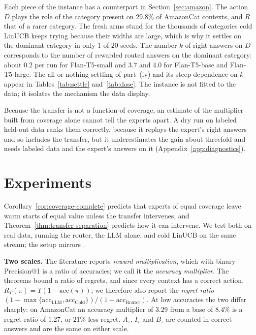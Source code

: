 \documentclass[anon]{alt2027} %
\begin{document}
\begin{remark}
\label{rem:transfer-amazon}
Each piece of the instance has a counterpart in Section~\ref{sec:amazon}.
The action $D$ plays the role of the category present on $29.8\%$ of
AmazonCat contexts, and $R$ that of a rarer category. The fresh arms stand for
the thousands of categories cold LinUCB keeps trying because their widths
are large, which is why it settles on the dominant category in only $1$ of
$20$ seeds. The number $k$ of right answers on $D$ corresponds to the number
of rewarded routed answers on the dominant category: about $0.2$ per run for
Flan-T5-small and $3.7$ and $4.0$ for Flan-T5-base and Flan-T5-large. The
all-or-nothing settling of part~(iv) and its steep dependence on $k$ appear
in Tables~\ref{tab:settle} and~\ref{tab:dose}. The instance is not fitted to
the data; it isolates the mechanism the data display.
\end{remark}

Because the transfer is not a function of coverage, an estimate of the
multiplier built from coverage alone cannot tell the experts apart. A dry run
on labeled held-out data ranks them correctly, because it replays the expert's
right answers and so includes the transfer, but it underestimates the gain
about threefold and needs labeled data and the expert's answers on it
(Appendix~\ref{app:diagnostics}).

\section{Experiments}
\label{sec:experiments}

Corollary~\ref{cor:coverage-complete} predicts that experts of equal coverage
leave warm starts of equal value unless the transfer intervenes, and
Theorem~\ref{thm:transfer-separation} predicts how it can intervene. We test
both on real data, running the router, the LLM alone, and cold LinUCB on the
same stream; the setup mirrors \citet{chen2024llmdecision}.

\textbf{Two scales.} The literature reports \emph{reward multiplication},
which with binary Precision@1 is a ratio of accuracies; we call it the
\emph{accuracy multiplier}. The theorems bound a ratio of regrets, and since
every context has a correct action, $R_T(\pi)=T(1-\mathrm{acc}(\pi))$; we
therefore also report the \emph{regret ratio}
$(1-\max\{\mathrm{acc}_{\mathrm{LLM}},\mathrm{acc}_{\mathrm{Cold}}\})/(1-\mathrm{acc}_{\mathrm{Router}})$.
At low accuracies the two differ sharply: on AmazonCat an accuracy multiplier
of $3.29$ from a base of $8.4\%$ is a regret ratio of $1.27$, or $21\%$ less
regret. $A_\tau$, $I_\tau$ and $B_\tau$ are counted in correct answers and are
the same on either scale.
\end{document}
